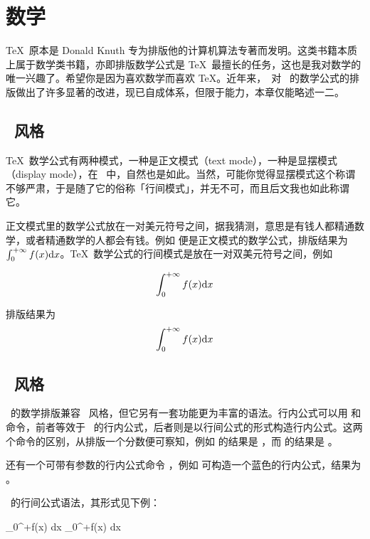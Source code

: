 \chapter{数学}

\TeX\ 原本是 Donald Knuth 专为排版他的计算机算法专著而发明。这类书籍本质上属于数学类书籍，亦即排版数学公式是 \TeX\ 最擅长的任务，这也是我对数学的唯一兴趣了。希望你是因为喜欢数学而喜欢 \TeX。近年来，\CONTEXT\ 对 \TEX\ 的数学公式的排版做出了许多显著的改进，现已自成体系，但限于能力，本章仅能略述一二。

\section{\TEX\ 风格}

\TeX\ 数学公式有两种模式，一种是正文模式（text mode），一种是显摆模式（display mode），在 \ConTeXt\ 中，自然也是如此。当然，可能你觉得显摆模式这个称谓不够严肃，于是随了它的俗称「行间模式」，并无不可，而且后文我也如此称谓它。

正文模式里的数学公式放在一对美元符号之间，据我猜测，意思是有钱人都精通数学，或者精通数学的人都会有钱。例如  便是正文模式的数学公式，排版结果为 $\int_0^{+\infty}f(x) {\rm d}x$。\TeX\ 数学公式的行间模式是放在一对双美元符号之间，例如

\starttyping[option=TEX]
$$
\int_0^{+\infty}f(x) {\rm d}x
$$
\stoptyping

\noindent 排版结果为
\blank[halfline]
\noindent $$
\int_0^{+\infty}f(x) {\rm d}x
$$

\section{\CONTEXT\ 风格}

\CONTEXT\ 的数学排版兼容 \TEX\ 风格，但它另有一套功能更为丰富的语法。行内公式可以用  和  命令，前者等效于 \TEX\ 的行内公式，后者则是以行间公式的形式构造行内公式。这两个命令的区别，从排版一个分数便可察知，例如  的结果是 ，而  的结果是 。

还有一个可带有参数的行内公式命令 ，例如  可构造一个蓝色的行内公式，结果为 。

\CONTEXT\ 的行间公式语法，其形式见下例：

\starttyping[option=TEX]
\startformula
\int_0^{+\infty}f(x) {\rm d}x
\stopformula
\stoptyping
\startformula
\int_0^{+\infty}f(x) {\rm d}x
\stopformula

